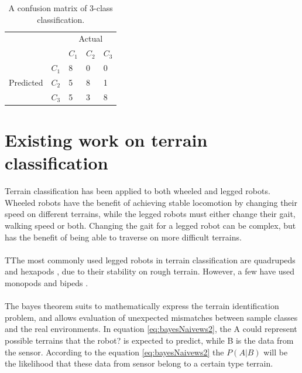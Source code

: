 \documentclass[USenglish]{ifimaster}  %
\begin{document}
	\begin{table}[h]
		\centering
		\begin{tabular}{ll|l|l|l|}
			\cline{3-5}
			&  & \multicolumn{3}{c|}{Actual} \\ \cline{3-5} 
			&  & $C_1$ & $C_2$ & $C_3$ \\ \hline
			\multicolumn{1}{|l|}{\multirow{3}{*}{Predicted}} & $C_1$ & 8 & 0 & 0 \\ \cline{2-5} 
			\multicolumn{1}{|l|}{} & $C_2$ & 5 & 8 & 1 \\ \cline{2-5} 
			\multicolumn{1}{|l|}{} & $C_3$ & 5 & 3 & 8 \\ \hline
		\end{tabular}
		\caption{A confusion matrix of 3-class classification.}
		\label{tab:cmatrix}
	\end{table}
	
	
\section{Existing work on terrain classification}
Terrain classification has been applied to both wheeled and legged robots. Wheeled robots have the benefit of achieving stable locomotion by changing their speed on different terrains, while the legged robots must either change their gait, walking speed or both. Changing the gait for a legged robot can be complex, but has the benefit of being able to traverse on more difficult terrains. 
\\
\\
TThe most commonly used legged robots in terrain classification are quadrupeds  \cite{6784609,littleDog,6849778,Hoffmann20141790} and hexapods \cite{Walas2015,26b23e912c654fe4b7478fd910130195,6569179}, due to their stability on rough terrain. However, a few have used monopods \cite{5602459} and bipeds \cite{7803265}.
\\
\\
The bayes theorem suits to mathematically express the terrain identification problem, and allows evaluation of unexpected mismatches between sample classes and the real environments. In equation \ref{eq:bayesNaivews2}, the A could represent possible terrains that the robot? is expected to predict, while B is the data from the sensor. According to the equation \ref{eq:bayesNaivews2} the $P(A \vert B)$ will be the likelihood that these data from sensor belong to a certain type terrain.

		
\end{document}
